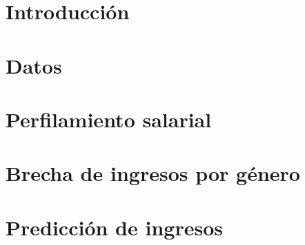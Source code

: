 \section{Introducción}

\section{Datos}

\section{Perfilamiento salarial}

\section{Brecha de ingresos por género}

\section{Predicción de ingresos}
